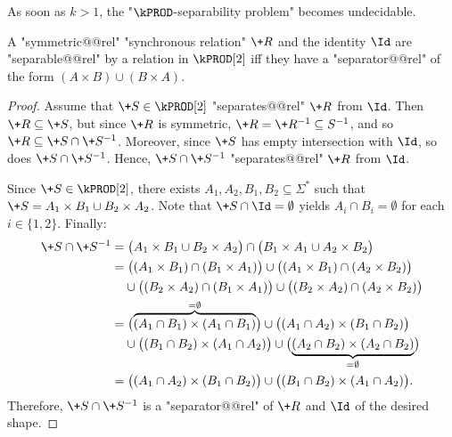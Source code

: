 As soon as $k>1$, the "$\kPROD$-separability problem" becomes undecidable.

\begin{lemma}
    A "symmetric@@rel" "synchronous relation" $\+R$ and the identity $\Id$ are "separable@@rel" by a relation in $\kPROD[2]$ iff they have a "separator@@rel" of the form $(A \times B) \cup (B \times A)$.
\end{lemma}
\begin{proof}
    Assume that $\+S \in \kPROD[2]$ "separates@@rel" $\+R$ from $\Id$.
    Then $\+R \subseteq \+S$, but since $\+R$ is symmetric, $\+R = \+R^{-1} \subseteq S^{-1}$,
    and so $\+R \subseteq \+S \cap \+S^{-1}$.
    Moreover, since $\+S$ has empty intersection with $\Id$, so does $\+S \cap \+S^{-1}$.
    Hence, $\+S \cap \+S^{-1}$ "separates@@rel" $\+R$ from $\Id$.

    Since $\+S \in \kPROD[2]$, there exists $A_1,A_2,B_1,B_2 \subseteq \Sigma^*$ such that
    $\+S = A_1 \times B_1 \cup B_2 \times A_2$.
    Note that $\+S \cap \Id = \emptyset$ yields $A_i \cap B_i = \emptyset$ for each $i \in \{1,2\}$.
    Finally:
    \begin{align*}
        \+S \cap \+S^{-1} &
        =
            \bigl( A_1 \times B_1 \cup B_2 \times A_2 \bigr)
            \cap \bigl( B_1 \times A_1 \cup A_2 \times B_2 \bigr) \\
        &
        =
            \bigl( (A_1 \times B_1) \cap (B_1 \times A_1) \bigr)
            \cup \bigl( (A_1 \times B_1) \cap (A_2 \times B_2) \bigr) \\
        &
        \hphantom{=\;} \cup \bigl( (B_2 \times A_2) \cap (B_1 \times A_1) \bigr)
            \cup \bigl( (B_2 \times A_2) \cap (A_2 \times B_2) \bigr) \\
        &
        =
            \bigl( \overbrace{(A_1 \cap B_1) \times (A_1 \cap B_1)}^{= \emptyset} \bigr)
            \cup \bigl( (A_1 \cap A_2) \times (B_1 \cap B_2) \bigr) \\
        &
        \hphantom{=\;} \cup \bigl( (B_1 \cap B_2) \times (A_1 \cap A_2) \bigr)
            \cup \bigl( \underbrace{(A_2 \cap B_2) \times (A_2 \cap B_2)}_{= \emptyset} \bigr)\\
        &
        = \bigl( (A_1 \cap A_2) \times (B_1 \cap B_2) \bigr)
            \cup \bigl( (B_1 \cap B_2) \times (A_1 \cap A_2) \bigr).
    \end{align*}
    Therefore, $\+S \cap \+S^{-1}$ is a "separator@@rel" of $\+R$ and $\Id$ of the desired shape.
\end{proof}

